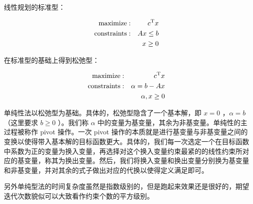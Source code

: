 线性规划的标准型：

$$
\begin{aligned}
	{\rm maximize}: & & c^{\rm T}x\\
	{\rm constraints}: & & Ax\le b\\
	& & x\ge 0
\end{aligned}
$$

在标准型的基础上得到松弛型：

$$
\begin{aligned}
    {\rm maximize}: & & c^{\rm T}x\\
    {\rm constraints}: & & \alpha=b-Ax\\
    & & \alpha,x\ge 0
\end{aligned}
$$

单纯性法以松弛型为基础。具体的，松弛型隐含了一个基本解，即 $x=0$ ，$\alpha = b$（这里要求 $b\ge 0$ ）。我们称 $\alpha$ 中的变量为基变量，其余为非基变量。单纯性的主过程被称作 pivot 操作。一次 pivot 操作的本质就是进行基变量与非基变量之间的变换以使得带入基本解的目标函数更大。具体的，我们每一次选定一个在目标函数中系数为正的变量为换入变量，再选择对这个换入变量约束最紧的的线性约束所对应的基变量，称其为换出变量。然后，我们将换入变量和换出变量分别换为基变量和非基变量，并对其余的式子做出对应的代换以使得定义满足即可。

另外单纯型法的时间复杂度虽然是指数级别的，但是跑起来效果还是很好的，期望迭代次数貌似可以大致看作约束个数的平方级别。

\inputminted{cpp}{src/linear/simplex.cpp}